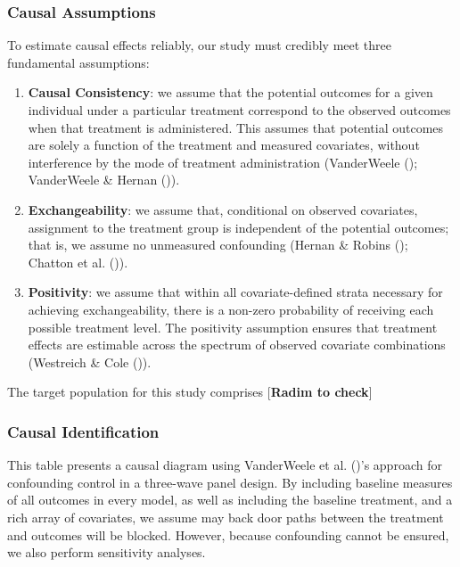 \documentclass[
  single column]{article}
\begin{document}
\subsubsection{Causal Assumptions}\label{causal-assumptions}

To estimate causal effects reliably, our study must credibly meet three
fundamental assumptions:

\begin{enumerate}
\def\labelenumi{\arabic{enumi}.}
\item
  \textbf{Causal Consistency}: we assume that the potential outcomes for
  a given individual under a particular treatment correspond to the
  observed outcomes when that treatment is administered. This assumes
  that potential outcomes are solely a function of the treatment and
  measured covariates, without interference by the mode of treatment
  administration (VanderWeele ();
  VanderWeele \& Hernan ()).
\item
  \textbf{Exchangeability}: we assume that, conditional on observed
  covariates, assignment to the treatment group is independent of the
  potential outcomes; that is, we assume no unmeasured confounding
  (Hernan \& Robins (); Chatton et
  al. ()).
\item
  \textbf{Positivity}: we assume that within all covariate-defined
  strata necessary for achieving exchangeability, there is a non-zero
  probability of receiving each possible treatment level. The positivity
  assumption ensures that treatment effects are estimable across the
  spectrum of observed covariate combinations (Westreich \& Cole
  ()).
\end{enumerate}

The target population for this study comprises {[}\textbf{Radim to
check}{]}

\subsubsection{Causal Identification}\label{causal-identification}

\begin{table}

\caption{\label{tbl-02}This table presents a causal diagram using
VanderWeele et al. ()'s approach for
confounding control in a three-wave panel design. By including baseline
measures of all outcomes in every model, as well as including the
baseline treatment, and a rich array of covariates, we assume may back
door paths between the treatment and outcomes will be blocked. However,
because confounding cannot be ensured, we also perform sensitivity
analyses.}

\centering{

\threevanderweeele

}

\end{table}%
\end{document}
